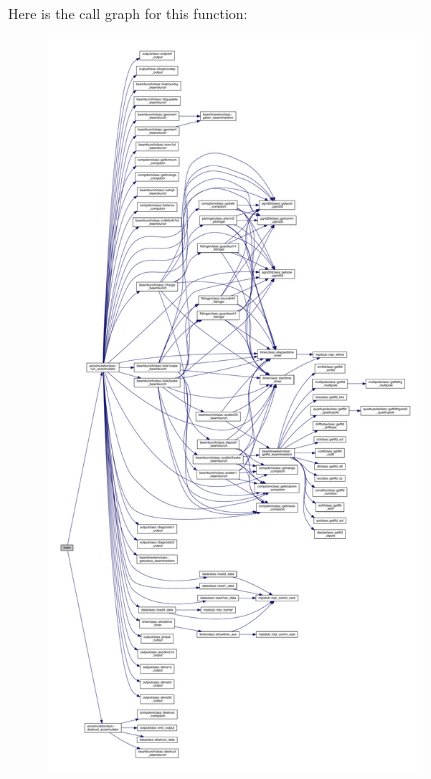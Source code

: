 Here is the call graph for this function\+:\nopagebreak
\begin{figure}[H]
\begin{center}
\leavevmode
\includegraphics[height=550pt]{main_8f90_a8ec2266d83cd6c0b762cbcbc92c0af3d_cgraph}
\end{center}
\end{figure}
